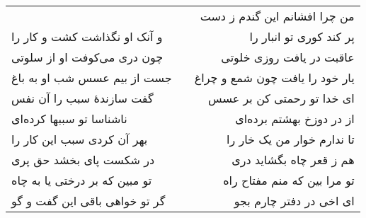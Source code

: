 \begin{center}
\begin{longtable}{l p{0.5cm} r}
&&
من چرا افشانم این گندم ز دست
\\
و آنک او نگذاشت کشت و کار را
&&
پر کند کوری تو انبار را
\\
چون دری می‌کوفت او از سلوتی
&&
عاقبت در یافت روزی خلوتی
\\
جست از بیم عسس شب او به باغ
&&
یار خود را یافت چون شمع و چراغ
\\
گفت سازندهٔ سبب را آن نفس
&&
ای خدا تو رحمتی کن بر عسس
\\
ناشناسا تو سببها کرده‌ای
&&
از در دوزخ بهشتم برده‌ای
\\
بهر آن کردی سبب این کار را
&&
تا ندارم خوار من یک خار را
\\
در شکست پای بخشد حق پری
&&
هم ز قعر چاه بگشاید دری
\\
تو مبین که بر درختی یا به چاه
&&
تو مرا بین که منم مفتاح راه
\\
گر تو خواهی باقی این گفت و گو
&&
ای اخی در دفتر چارم بجو
\\
\end{longtable}
\end{center}
